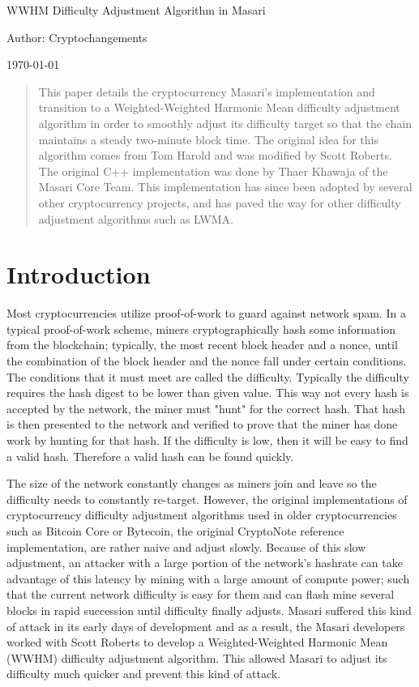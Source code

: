 \documentclass{article}
\author{cryptochangements}
\date{\today}
\begin{document}
\noindent\Large WWHM Difficulty Adjustment Algorithm in Masari

\small\noindent Author: Cryptochangements

\noindent\today
\begin{abstract}
This paper details the
cryptocurrency Masari's implementation
and transition to a Weighted-Weighted
Harmonic Mean difficulty adjustment
algorithm in order to smoothly adjust its difficulty
target so that the chain maintains a steady two-minute
block time. The original idea for this
algorithm comes from Tom Harold and
was modified by Scott Roberts. The original C++
implementation was done by Thaer
Khawaja of the Masari Core Team. This
implementation has since been adopted
by several other cryptocurrency projects,
and has paved the way for other
difficulty adjustment algorithms such as
LWMA.
\end{abstract}

\section{Introduction}
Most cryptocurrencies utilize proof-of-work to guard against network spam. In a typical proof-of-work scheme, miners cryptographically hash some information from the blockchain; typically, the most recent block header and a nonce, until the combination of the block header and the nonce fall under certain conditions. The conditions that it must meet are called the difficulty. Typically the difficulty requires the hash digest to be lower than given value. This way not every hash is accepted by the network, the miner must "hunt" for the correct hash. That hash is then presented to the network and verified to prove that the miner has done work by hunting for that hash. If the difficulty is low, then it will be easy to find a valid hash. Therefore a valid hash can be found quickly.

The size of the network constantly changes as miners join and leave so the difficulty needs to constantly re-target. However, the original
implementations of cryptocurrency
difficulty adjustment algorithms used in
older cryptocurrencies such as Bitcoin Core or Bytecoin,
the original CryptoNote reference
implementation, are rather naive and
adjust slowly. Because of this slow
adjustment, an attacker with a large
portion of the network's hashrate can take
advantage of this latency by mining with a
large amount of compute power; such that
the current network difficulty is easy for
them and can flash mine several blocks in
rapid succession until difficulty finally
adjusts. Masari suffered this kind of
attack in its early days of development
and as a result, the Masari developers
worked with Scott Roberts to develop a Weighted-Weighted Harmonic Mean (WWHM)
difficulty adjustment algorithm. This allowed Masari to adjust its difficulty
much quicker and prevent this kind of
attack.
\end{document}
